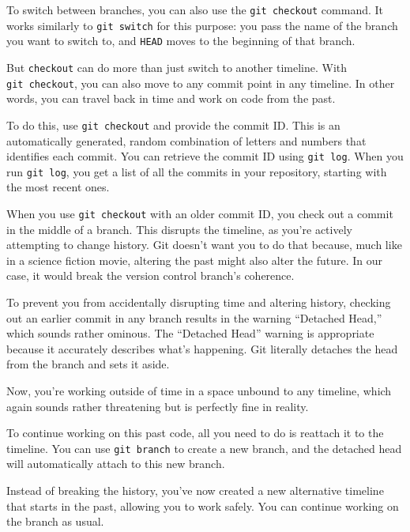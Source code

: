 \documentclass[
  letterpaper,
  DIV=11,
  numbers=noendperiod]{scrreprt}
\begin{document}
To switch between branches, you can also use the \texttt{git\ checkout}
command. It works similarly to \texttt{git\ switch} for this purpose:
you pass the name of the branch you want to switch to, and \texttt{HEAD}
moves to the beginning of that branch.

But \texttt{checkout} can do more than just switch to another timeline.
With \texttt{git\ checkout}, you can also move to any commit point in
any timeline. In other words, you can travel back in time and work on
code from the past.

To do this, use \texttt{git\ checkout} and provide the commit ID. This
is an automatically generated, random combination of letters and numbers
that identifies each commit. You can retrieve the commit ID using
\texttt{git\ log}. When you run \texttt{git\ log}, you get a list of all
the commits in your repository, starting with the most recent ones.

When you use \texttt{git\ checkout} with an older commit ID, you check
out a commit in the middle of a branch. This disrupts the timeline, as
you're actively attempting to change history. Git doesn't want you to do
that because, much like in a science fiction movie, altering the past
might also alter the future. In our case, it would break the version
control branch's coherence.

To prevent you from accidentally disrupting time and altering history,
checking out an earlier commit in any branch results in the warning
``Detached Head,'' which sounds rather ominous. The ``Detached Head''
warning is appropriate because it accurately describes what's happening.
Git literally detaches the head from the branch and sets it aside.

Now, you're working outside of time in a space unbound to any timeline,
which again sounds rather threatening but is perfectly fine in reality.

To continue working on this past code, all you need to do is reattach it
to the timeline. You can use \texttt{git\ branch} to create a new
branch, and the detached head will automatically attach to this new
branch.

Instead of breaking the history, you've now created a new alternative
timeline that starts in the past, allowing you to work safely. You can
continue working on the branch as usual.
\end{document}
